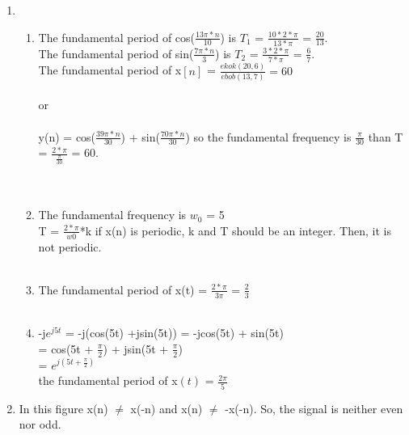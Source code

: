 \documentclass[10pt,a4paper, margin=1in]{article}
\begin{document}
\begin{enumerate}
\item 
    \begin{enumerate}
    \item %
    The fundamental period of cos($\frac{13 \pi*n}{10}$) is $T_{1}$ = $\frac{10*2*\pi}{13* \pi}$ = $\frac{20}{13}$.\\
    The fundamental period of sin($\frac{7 \pi*n}{3}$) is $T_{2}$ = $\frac{3*2*\pi}{7* \pi}$ = $\frac{6}{7}$.\\
    The fundamental period of x$ \left[ n \right]$ = $\frac{ekok(20,6)}{ebob(13,7)} = 60$ \\\\
    or\\\\
    y(n) = cos($\frac{39 \pi*n}{30}$) + sin($\frac{70 \pi*n}{30}$) so the fundamental frequency is  $\frac{\pi}{30}$ than T =  $\frac{2*\pi}{\frac{\pi}{30}}$ = 60.\\\\\\
    
    
    \item %
    
    The fundamental frequency is $w_{0}$ = 5\\
    T = $\frac{2*\pi}{w0}$*k if x(n) is periodic, k and T should be an integer. Then, it is not periodic.\\\\
    \item %
    
     The fundamental period of x(t) = $\frac{2* \pi}{3\pi}$ = $\frac{2}{3}$\\\\
     
     
    \item %
    
    -j$e^{j5t} $ = -j(cos(5t) +jsin(5t)) = -jcos(5t) + sin(5t)\\
    = cos(5t + $\frac{\pi}{2}$) + jsin(5t + $\frac{\pi}{2}$)\\
    = $e^{j(5t + \frac{\pi}{2} )}$\\
    the fundamental period of x$ \left( t \right)$ = $ \frac{2\pi}{5}$
    
    \end{enumerate}
\newpage
\item %
    In this figure x(n) $\neq$ x(-n) and x(n) $\neq$ -x(-n). So, the signal is neither even nor odd.\\\\\\\\
    

\end{enumerate}
\end{document}

